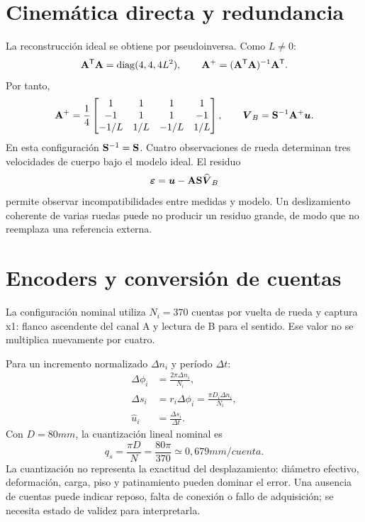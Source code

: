 \section{Cinemática directa y redundancia}
La reconstrucción ideal se obtiene por pseudoinversa. Como $L\ne0$:
\begin{equation}
\mathbf{A}^{\mathsf{T}}\mathbf{A}=\operatorname{diag}(4,4,4L^2),
\qquad \mathbf{A}^+=(\mathbf{A}^{\mathsf{T}}\mathbf{A})^{-1}\mathbf{A}^{\mathsf{T}}.
\end{equation}
Por tanto,
\begin{equation}
\mathbf{A}^+=\frac14\begin{bmatrix}
1&1&1&1\\-1&1&1&-1\\-1/L&1/L&-1/L&1/L
\end{bmatrix},
\qquad \boldsymbol{V}_B=\mathbf{S}^{-1}\mathbf{A}^+\boldsymbol{u}.
\label{eq:directam}
\end{equation}
En esta configuración $\mathbf{S}^{-1}=\mathbf{S}$. Cuatro observaciones de rueda determinan tres velocidades de cuerpo bajo el modelo ideal. El residuo
\begin{equation}
\boldsymbol{\varepsilon}=\boldsymbol{u}-\mathbf{A}\mathbf{S}\widehat{\boldsymbol{V}}_B
\end{equation}
permite observar incompatibilidades entre medidas y modelo. Un deslizamiento coherente de varias ruedas puede no producir un residuo grande, de modo que no reemplaza una referencia externa.

\section{Encoders y conversión de cuentas}
La configuración nominal utiliza $N_i=370$ cuentas por vuelta de rueda y captura x1: flanco ascendente del canal A y lectura de B para el sentido. Ese valor no se multiplica nuevamente por cuatro.

Para un incremento normalizado $\Delta n_i$ y período $\Delta t$:
\begin{align}
\Delta\phi_i&=\frac{2\pi\Delta n_i}{N_i},\\
\Delta s_i&=r_i\Delta\phi_i=\frac{\pi D_i\Delta n_i}{N_i},\\
\widehat u_i&=\frac{\Delta s_i}{\Delta t}.
\end{align}
Con $D=80\unit{mm}$, la cuantización lineal nominal es
\begin{equation}
q_s=\frac{\pi D}{N}=\frac{80\pi}{370}\simeq0{,}679\unit{mm/cuenta}.
\end{equation}
La cuantización no representa la exactitud del desplazamiento: diámetro efectivo, deformación, carga, piso y patinamiento pueden dominar el error. Una ausencia de cuentas puede indicar reposo, falta de conexión o fallo de adquisición; se necesita estado de validez para interpretarla.

